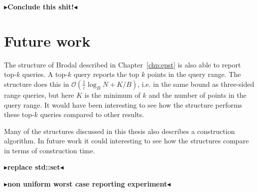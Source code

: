 \documentclass[twoside,11pt,openright]{report}
\def \epsilon {\varepsilon}
\newcommand{\todo}[1]{{\color[rgb]{.5,0,0}\textbf{$\blacktriangleright$#1$\blacktriangleleft$}}}
\begin{document}
\todo{Conclude this shit!}

\section{Future work}
The structure of Brodal described in Chapter~\ref{chp:epst} is also able to report top-$k$ queries. A top-$k$ query reports the top $k$ points in the query range. The structure does this in $\mathcal{O}(\frac{1}{\epsilon}\log_B N + K/B)$, i.e. in the same bound as three-sided range queries, but here $K$ is the minimum of $k$ and the number of points in the query range. It would have been interesting to see how the structure performs these top-$k$ queries compared to other results.

Many of the structures discussed in this thesis also describes a construction algorithm. In future work it could interesting to see how the structures compare in terms of construction time.

\todo{replace std::set}

\todo{non uniform worst case reporting experiment}

\clearpage
{}

\end{document}
